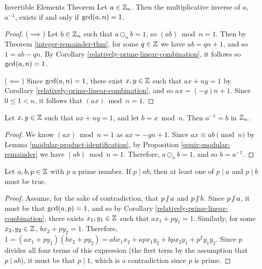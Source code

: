 \begin{thm}{Invertible Elements Theorem}\label{invertible-elements}\proofbreak
    Let $a \in \mathbb{Z}_n$. Then the multiplicative inverse of $a$, $a^{-1}$, exists if and only if $\operatorname{gcd}(a, n) = 1$.
\end{thm}

\begin{proof}\proofbreak
    ($\implies$) Let $b \in \mathbb{Z}_n$ such that $a \odot_n b = 1$, so $(ab) \bmod n = 1$. Then by Theorem \ref{integer-remainder-thm}, for some $q \in \mathbb{Z}$ we have $ab = qn + 1$, and so $1 = ab - qn$. By Corollary \ref{relatively-prime-linear-combination}, it follows so $\operatorname{gcd}(a, n) = 1$.

    ($\impliedby$) Since $\operatorname{gcd}(a, n) = 1$, there exist $x, y \in \mathbb{Z}$ such that $ax + ny = 1$ by Corollary \ref{relatively-prime-linear-combination}, and so $ax = (-y)n + 1$. Since $0 \leq 1 < n$, it follows that $(ax) \bmod n = 1$.
\end{proof}

\begin{cor}
    Let $x, y \in \mathbb{Z}$ such that $ax + ny = 1$, and let $b = x \bmod n$. Then $a^{-1} = b$ in $\mathbb{Z}_n$.
\end{cor}

\begin{proof}
    We know $(ax) \bmod n = 1$ as $ax = -yn + 1$. Since $ax \equiv ab \pmod n$ by Lemma \ref{modular-product-identification}, by Proposition \ref{equiv-modular-remainder} we have $(ab) \bmod n = 1$. Therefore, $a \odot_n b = 1$, and so $b = a^{-1}$.
\end{proof}

\begin{lemma}\label{prime-division-one}
    Let $a, b, p \in \mathbb{Z}$ with $p$ a prime number. If $p \mid ab$, then at least one of $p \mid a$ and $p \mid b$ must be true.
\end{lemma}

\begin{proof}
    Assume, for the sake of contradiction, that $p \centernot\mid a$ and $p \centernot\mid b$. Since $p \centernot\mid a$, it must be that $\operatorname{gcd}(a, p) = 1$, and so by Corollary \ref{relatively-prime-linear-combination}, there exists $x_1, y_1 \in \mathbb{Z}$ such that $ax_1 + py_1 = 1$. Similarly, for some $x_2, y_2 \in \mathbb{Z}$, $bx_2 + py_2 = 1$. Therefore, $1 = (ax_1 + py_1)(bx_2 + py_2) = abx_1x_2 + apx_1y_2 + bpx_2y_1 + p^2y_1y_2$. Since $p$ divides all four terms of this expression (the first term by the assumption that $p \mid ab$), it must be that $p \mid 1$, which is a contradiction since $p$ is prime.
\end{proof}

